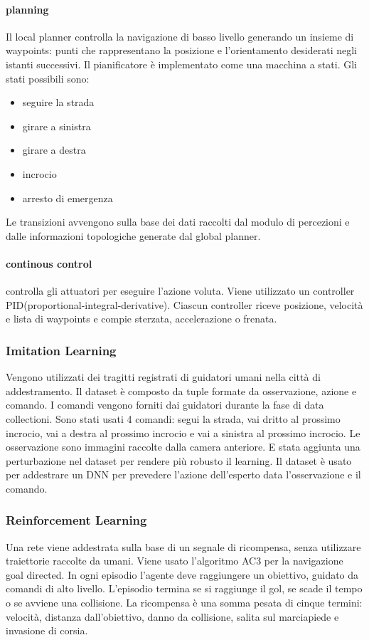 \paragraph{planning} Il local planner controlla la navigazione di basso livello generando un insieme di waypoints: punti che rappresentano la posizione e l'orientamento desiderati
negli istanti successivi. Il pianificatore è implementato come una macchina a stati. Gli stati possibili sono:
\begin{itemize}
    \item seguire la strada
    \item girare a sinistra
    \item girare a destra
    \item incrocio
    \item arresto di emergenza
\end{itemize}
Le transizioni avvengono sulla base dei dati raccolti dal modulo di percezioni e dalle informazioni topologiche generate dal global planner.
\paragraph{continous control} controlla gli attuatori per eseguire l'azione voluta. Viene utilizzato un controller PID(proportional-integral-derivative).
Ciascun controller riceve posizione, velocità e lista di waypoints e compie sterzata, accelerazione o frenata.
\subsubsection{Imitation Learning}
Vengono utilizzati dei tragitti registrati di guidatori umani nella città di addestramento. Il dataset è composto da tuple formate da osservazione, azione e comando.
I comandi vengono forniti dai guidatori durante la fase di data collectioni. Sono stati usati 4 comandi: segui la strada, vai dritto al prossimo incrocio, vai a destra al prossimo incrocio e vai a sinistra al 
prossimo incrocio. Le osservazione sono immagini raccolte dalla camera anteriore. E stata aggiunta una perturbazione nel dataset per rendere più robusto il learning.
Il dataset è usato per addestrare un DNN per prevedere l'azione dell'esperto data l'osservazione e il comando.
\subsubsection{Reinforcement Learning}
Una rete viene addestrata sulla base  di un segnale di ricompensa, senza utilizzare traiettorie raccolte da umani. Viene usato l'algoritmo AC3 per la navigazione goal directed.
In ogni episodio l'agente deve raggiungere un obiettivo, guidato da comandi di alto livello. L'episodio termina se si raggiunge il gol, se scade il tempo o se avviene una collisione.
La ricompensa è una somma pesata di cinque termini: velocità, distanza dall'obiettivo, danno da collisione, salita sul marciapiede e invasione di corsia.